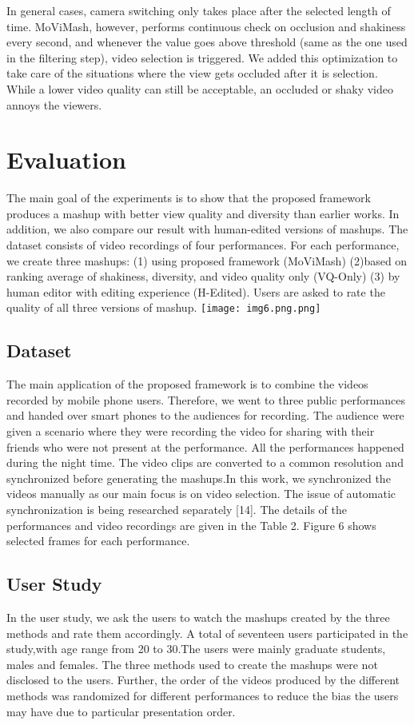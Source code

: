 \documentclass{sig-alternate}
\begin{document}
In general cases, camera switching only takes place after the selected length of time. MoViMash, however, performs continuous check on occlusion and shakiness every second, and whenever the value goes above threshold (same as the one used in the filtering step), video selection is triggered. We added this optimization to take care of the situations where the view gets occluded after it is selection. While a lower video quality can still be acceptable, an occluded or shaky video annoys the viewers.

\section{Evaluation}
The main goal of the experiments is to show that the proposed framework produces a mashup with better view quality and diversity than earlier works. In addition, we also compare our result with human-edited versions of mashups. The dataset consists of video recordings of four performances. For each performance, we create three mashups: (1) using proposed framework (MoViMash) (2)based on ranking average of shakiness, diversity, and video quality only (VQ-Only) (3) by human editor with editing experience (H-Edited). Users are asked to rate the quality of all three versions of mashup.
\texttt{[image: img6.png.png]}
\subsection{Dataset}
The main application of the proposed framework is to combine the videos recorded by mobile phone users. Therefore, we went to three public performances and handed over smart phones to the audiences for recording. The audience were given a scenario where they were recording the video for sharing with their friends who were not present at the performance. All the performances happened during the night time. The video clips are converted to a common resolution and synchronized before generating the mashups.In this work, we synchronized the videos manually as our main focus is on video selection. The issue of automatic synchronization is being researched separately [14]. The details of the performances and video recordings are given in the Table 2. Figure 6 shows selected frames for each performance.

\subsection{User Study}
In the user study, we ask the users to watch the mashups created by the three methods and rate them accordingly. A total of seventeen users participated in the study,with age range from 20 to 30.The users were mainly graduate students, males and females. The three methods used to create the mashups were not disclosed to the
users. Further, the order of the videos produced by the different methods was randomized for different performances to reduce the bias the users may have due to particular presentation order.
\end{document}
